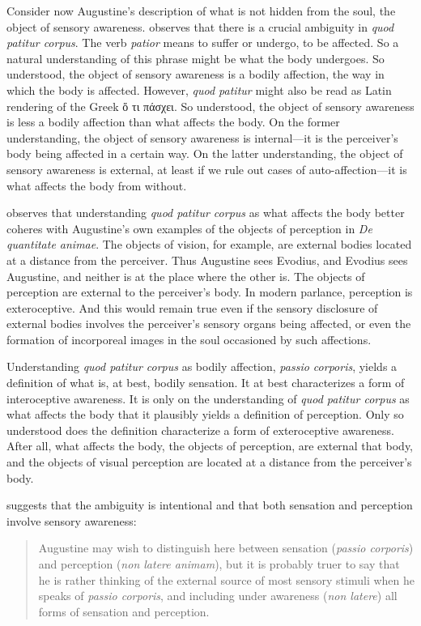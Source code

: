 \documentclass[12pt]{article}
\begin{document}
Consider now Augustine's description of what is not hidden from the soul, the object of sensory awareness. \citet[274--278]{Brittain:2002hl} observes that there is a crucial ambiguity in \emph{quod patitur corpus}. The verb \emph{patior} means to suffer or undergo, to be affected. So a natural understanding of this phrase might be what the body undergoes. So understood, the object of sensory awareness is a bodily affection, the way in which the body is affected. However, \emph{quod patitur} might also be read as Latin rendering of the Greek {\sbl ὅ τι πάσχει}. So understood, the object of sensory awareness is less a bodily affection than what affects the body. On the former understanding, the object of sensory awareness is internal---it is the perceiver's body being affected in a certain way. On the latter understanding, the object of sensory awareness is external, at least if we rule out cases of auto-affection---it is what affects the body from without. 

\citet[]{Brittain:2002hl} observes that understanding \emph{quod patitur corpus} as what affects the body better coheres with Augustine's own examples of the objects of perception in \emph{De quantitate animae}. The objects of vision, for example, are external bodies located at a distance from the perceiver. Thus Augustine sees Evodius, and Evodius sees Augustine, and neither is at the place where the other is. The objects of perception are external to the perceiver's body. In modern parlance, perception is exteroceptive. And this would remain true even if the sensory disclosure of external bodies involves the perceiver's sensory organs being affected, or even the formation of incorporeal images in the soul occasioned by such affections. 

Understanding \emph{quod patitur corpus} as bodily affection, \emph{passio corporis}, yields a definition of what is, at best, bodily sensation. It at best characterizes a form of interoceptive awareness. It is only on the understanding of \emph{quod patitur corpus} as what affects the body that it plausibly yields a definition of perception. Only so understood does the definition characterize a form of exteroceptive awareness. After all, what affects the body, the objects of perception, are external that body, and the objects of visual perception are located at a distance from the perceiver's body.

\citet[]{ODaly:1987fq} suggests that the ambiguity is intentional and that both sensation and perception involve sensory awareness:
\begin{quote}
	Augustine may wish to distinguish here between sensation (\emph{passio corporis}) and perception (\emph{non latere animam}), but it is probably truer to say that he is rather thinking of the external source of most sensory stimuli when he speaks of \emph{passio corporis}, and including under awareness (\emph{non latere}) all forms of sensation and perception.
\end{quote}
\end{document}
